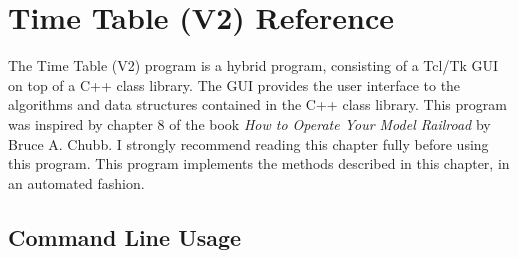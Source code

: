
\chapter{Time Table (V2) Reference}
\label{chpt:tt:Reference}

The Time Table (V2) program is a hybrid program, consisting of a Tcl/Tk
GUI on top of a C++ class library.  The GUI provides the user interface
to the algorithms and data structures contained in the C++ class
library.  This program was inspired by chapter 8 of the book {\it How
to Operate Your Model Railroad}\cite{Chubb77} by Bruce A. Chubb.  I
strongly recommend reading this chapter fully before using this
program.  This program implements the methods described in this
chapter, in an automated fashion.

\section{Command Line Usage}

